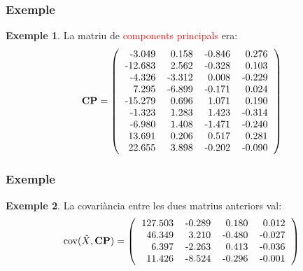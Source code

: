\documentclass[12pt,t]{beamer}
\newcommand{\red}[1]{\textcolor{red}{#1}}
\theoremstyle{plain}
\theoremstyle{definition}
\newtheorem{exemple}{Exemple}
\begin{document}
\begin{frame}
\frametitle{Exemple}
\begin{exemple}
La matriu de \red{components principals} era:
\[
{\mathbf{CP}}=\left(
\begin{tabular}{rrrr}
  -3.049 & 0.158 & -0.846 & 0.276 \\ 
  -12.683 & 2.562 & -0.328 & 0.103 \\ 
  -4.326 & -3.312 & 0.008 & -0.229 \\ 
  7.295 & -6.899 & -0.171 & 0.024 \\ 
  -15.279 & 0.696 & 1.071 & 0.190 \\ 
  -1.323 & 1.283 & 1.423 & -0.314 \\ 
  -6.980 & 1.408 & -1.471 & -0.240 \\ 
  13.691 & 0.206 & 0.517 & 0.281 \\ 
  22.655 & 3.898 & -0.202 & -0.090 \\ 
  \end{tabular}\right)
\]
\end{exemple}
\end{frame}


\begin{frame}
\frametitle{Exemple}
\begin{exemple}
La covariància entre les dues matrius anteriors val:
\[
\mbox{cov}(\tilde{X},{\mathbf{CP}})=\left(
\begin{tabular}{rrrr}
  127.503 & -0.289 & 0.180 & 0.012 \\ 
  46.349 & 3.210 & -0.480 & -0.027 \\ 
  6.397 & -2.263 & 0.413 & -0.036 \\ 
  11.426 & -8.524 & -0.296 & -0.001 \\ 
  \end{tabular}\right)
\]

\end{exemple}
\end{frame}
\end{document}
